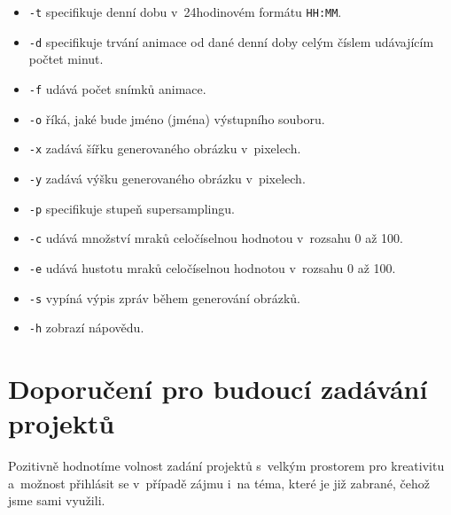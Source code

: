 \documentclass[12pt,a4paper,titlepage,final]{report}
\begin{document}
\begin{itemize}
\item {\tt -t} specifikuje denní dobu v~24hodinovém formátu {\tt HH:MM}.
\item {\tt -d} specifikuje trvání animace od dané denní doby celým číslem udávajícím počtet minut.
\item {\tt -f} udává počet snímků animace.
\item {\tt -o} říká, jaké bude jméno (jména) výstupního souboru.
\item {\tt -x} zadává šířku generovaného obrázku v~pixelech.
\item {\tt -y} zadává výšku generovaného obrázku v~pixelech.
\item {\tt -p} specifikuje stupeň supersamplingu.
\item {\tt -c} udává množství mraků celočíselnou hodnotou v~rozsahu 0 až 100.
\item {\tt -e} udává hustotu mraků celočíselnou hodnotou v~rozsahu 0 až 100.
\item {\tt -s} vypíná výpis zpráv během generování obrázků.
\item {\tt -h} zobrazí nápovědu.
\end{itemize}

\chapter{Doporučení pro budoucí zadávání projektů}

Pozitivně hodnotíme volnost zadání projektů s~velkým prostorem pro
kreativitu a~možnost přihlásit se v~případě zájmu i~na téma, které je již
zabrané, čehož jsme sami využili.




\nocite{cite1}
\nocite{cite2}
\nocite{cite3}


\end{document}
